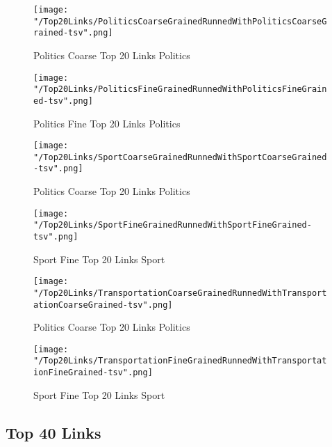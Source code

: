 \documentclass[thesis=M,english]{FITthesis}[2018/05/30]
\begin{document}
	\begin{figure}[H]\centering
		\texttt{[image: "/Top20Links/PoliticsCoarseGrainedRunnedWithPoliticsCoarseGrained-tsv".png]}
		\caption{Politics Coarse Top 20 Links Politics}\label{img:PoliticsWithPoliticsCoarseTop20}
	\end{figure}	

	\begin{figure}[H]\centering
		\texttt{[image: "/Top20Links/PoliticsFineGrainedRunnedWithPoliticsFineGrained-tsv".png]}
		\caption{Politics Fine Top 20 Links Politics}\label{img:PoliticsWithPoliticsFineTop20}
	\end{figure}

	\begin{figure}[H]\centering
		\texttt{[image: "/Top20Links/SportCoarseGrainedRunnedWithSportCoarseGrained-tsv".png]}
		\caption{Politics Coarse Top 20 Links Politics}\label{img:SportWithSportCoarseTop20}
	\end{figure}		

	\begin{figure}[H]\centering
		\texttt{[image: "/Top20Links/SportFineGrainedRunnedWithSportFineGrained-tsv".png]}
		\caption{Sport Fine Top 20 Links Sport}\label{img:SportWithSportFineTop20}	
	\end{figure}
	
	\begin{figure}[H]\centering
		\texttt{[image: "/Top20Links/TransportationCoarseGrainedRunnedWithTransportationCoarseGrained-tsv".png]}
		\caption{Politics Coarse Top 20 Links Politics}\label{img:TransportationWithTransportationCoarseTop20}
	\end{figure}		

	\begin{figure}[H]\centering
		\texttt{[image: "/Top20Links/TransportationFineGrainedRunnedWithTransportationFineGrained-tsv".png]}
		\caption{Sport Fine Top 20 Links Sport}\label{img:TransportationWithTransportationFineTop20}	
	\end{figure}

\subsection{Top 40 Links}
\end{document}
